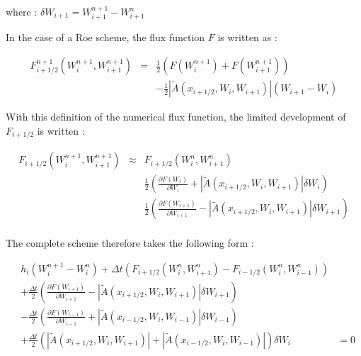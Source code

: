 where : $\delta W_{i+1} = W_{i+1}^{n+1} - W_{i+1}^n$

\vspace{0.5cm}

In the case of a Roe scheme, the flux function $F$ is written as :

\begin{eqnarray}
 F_{i+1/2}^{n+1}(W_{i}^{n+1},W_{i+1}^{n+1}) & = & \frac{1}{2} ( F(W_{i}^{n+1}) + F(W_{i+1}^{n+1})) \nonumber \\
                                            &   & -\frac{1}{2} |\tilde A (x_{i+1/2},W_i,W_{i+1})| (W_{i+1}-W_{i})
\end{eqnarray}

\vspace{0.5cm}

With this definition of the numerical flux function, the limited development of $F_{i+1/2}$ is written :

\begin{eqnarray}
 F_{i+1/2}(W_{i}^{n+1},W_{i+1}^{n+1}) & \approx & F_{i+1/2}(W_{i}^{n},W_{i+1}^{n}) \nonumber \\
                                      &         & \frac{1}{2} \left ( \frac{\partial F(W_i)}{\partial W_i} + |\tilde A (x_{i+1/2},W_i,W_{i+1})| \delta W_i \right ) \nonumber \\
                                      &         & \frac{1}{2} \left ( \frac{\partial F(W_{i+1})}{\partial W_{i+1}} - |\tilde A (x_{i+1/2},W_i,W_{i+1})| \delta W_{i+1} \right ) \nonumber \\
\end{eqnarray}

\vspace{0.5cm}

The complete scheme therefore takes the following form :

\begin{eqnarray}
 & h_{i} (W_{i}^{n+1}-W_{i}^{n}) + \Delta t \left ( F_{i+1/2}(W_{i}^n,W_{i+1}^n) - F_{i-1/2}(W_{i}^n,W_{i-1}^n) \right ) & \nonumber \\
 & + \frac{\Delta t}{2} \left ( \frac{\partial F(W_{i+1})}{\partial W_{i+1}} - |\tilde{A}(x_{i+1/2},W_i,W_{i+1})|\delta W_{i+1} \right ) & \nonumber \\
 & - \frac{\Delta t}{2} \left ( \frac{\partial F(W_{i-1})}{\partial W_{i-1}} + |\tilde{A}(x_{i-1/2},W_i,W_{i-1})|\delta W_{i-1} \right ) & \nonumber \\
 & + \frac{\Delta t}{2} \left ( |\tilde{A}(x_{i+1/2},W_i,W_{i+1})| + |\tilde{A}(x_{i-1/2},W_i,W_{i-1})| \right ) \delta W_i & = 0 \nonumber \\
\end{eqnarray}


